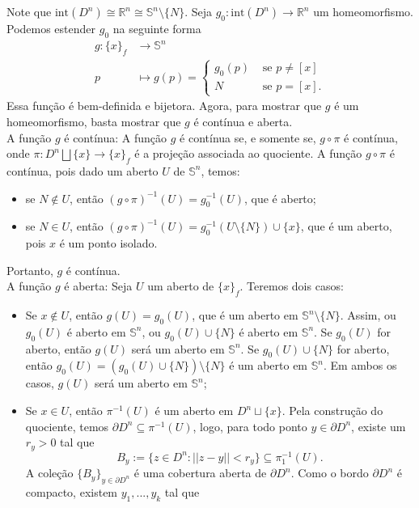 \begin{dem}
    Note que $\text{int}(D^n)\cong \mathbb{R}^n\cong \mathbb{S}^n\setminus\{N\}$. Seja $g_0:\text{int}(D^n)\rightarrow \mathbb{R}^n$ um homeomorfismo. Podemos estender $g_0$ na seguinte forma 
    \begin{align*}
        g:\{x\}_f&\longrightarrow \mathbb{S}^n\\
        p&\longmapsto g(p)=\begin{cases}
            g_0(p) &\text{ se }p\ne [x]\\
            N &\text{ se }p=[x].
        \end{cases}
    \end{align*}
    Essa função é bem-definida e bijetora. Agora, para mostrar que $g$ é um homeomorfismo, basta mostrar que $g$ é contínua e aberta.\\
    A função $g$ é contínua: A função $g$ é contínua se, e somente se, $g\circ \pi$ é contínua, onde $\pi:D^n\bigsqcup \{x\}\rightarrow \{x\}_f$ é a projeção associada ao quociente. A função $g\circ \pi$ é contínua, pois dado um aberto $U$ de $\mathbb{S}^n$, temos:
    \begin{itemize}
        \item se $N\notin U$, então $(g\circ\pi)^{-1}(U)=g_0^{-1}(U)$, que é aberto;
        \item se $N\in U$, então $(g\circ \pi)^{-1}(U)=g_0^{-1}(U\setminus\{N\})\cup \{x\}$, que é um aberto, pois $x$ é um ponto isolado.
    \end{itemize}
    Portanto, $g$ é contínua.\\
    A função $g$ é aberta: Seja $U$ um aberto de $\{x\}_f$. Teremos dois casos: 
    \begin{itemize}
        \item Se $x\notin U$, então $g(U)=g_0(U)$, que é um aberto em  $\mathbb{S}^n\setminus\{N\}$. Assim, ou $g_0(U)$ é aberto em $\mathbb{S}^n$, ou $g_0(U)\cup\{N\}$ é aberto em $\mathbb{S}^n$. Se $g_0(U)$ for aberto, então $g(U)$ será um aberto em $\mathbb{S}^n$. Se $g_0(U)\cup \{N\}$ for aberto, então $g_0(U)=(g_0(U)\cup\{N\})\setminus\{N\}$ é um aberto em $\mathbb{S}^n$. Em ambos os casos, $g(U)$ será um aberto em $\mathbb{S}^n$;
        \item Se $x\in U$, então $\pi^{-1} (U)$ é um aberto em $D^n\sqcup \{x\}$. Pela construção do quociente, temos $\partial D^n\subseteq\pi^{-1}(U)$, logo, para todo ponto $y\in \partial D^n$, existe um $r_y>0$ tal que 
        $$B_y:=\{z\in D^n: ||z-y||<r_y\}\subseteq \pi_1^{-1}(U).$$
        A coleção $\{B_y\}_{y\in \partial D^n}$ é uma cobertura aberta de $\partial D^n$. Como o bordo $\partial D^n$ é compacto, existem $y_1,...,y_k$ tal que 

\end{itemize}
\end{dem}

